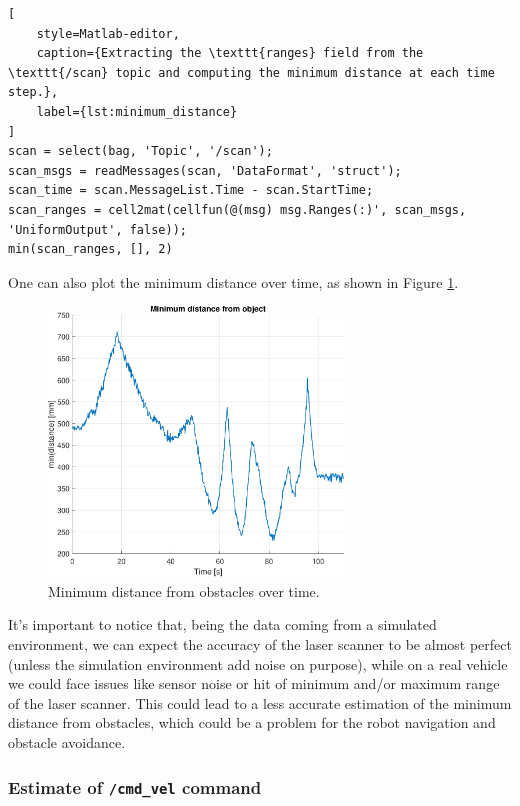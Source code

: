 \begin{lstlisting}[
    style=Matlab-editor,
    caption={Extracting the \texttt{ranges} field from the \texttt{/scan} topic and computing the minimum distance at each time step.},
    label={lst:minimum_distance}
]
scan = select(bag, 'Topic', '/scan');
scan_msgs = readMessages(scan, 'DataFormat', 'struct');
scan_time = scan.MessageList.Time - scan.StartTime;
scan_ranges = cell2mat(cellfun(@(msg) msg.Ranges(:)', scan_msgs, 'UniformOutput', false));
min(scan_ranges, [], 2)
\end{lstlisting}

One can also plot the minimum distance over time, as shown in Figure \ref{fig:minimum_distance}.

\begin{figure}[H]
    \centering
    \includegraphics[width=0.7\textwidth]{./img/MATLAB/minimum_distance.pdf}
    \caption{Minimum distance from obstacles over time.}
    \label{fig:minimum_distance}
\end{figure}

It's important to notice that, being the data coming from a simulated environment, we can expect the accuracy of the laser scanner to be almost perfect (unless the simulation environment add noise on purpose), while on a real vehicle we could face issues like sensor noise or hit of minimum and/or maximum range of the laser scanner.
This could lead to a less accurate estimation of the minimum distance from obstacles, which could be a problem for the robot navigation and obstacle avoidance.


\subsubsection{Estimate of \texttt{/cmd\_vel} command}
\label{subsubsec:cmd_vel}

